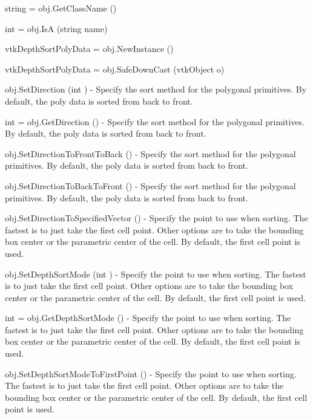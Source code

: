 \begin{DoxyItemize}
\item {\ttfamily string = obj.\-Get\-Class\-Name ()}  
\item {\ttfamily int = obj.\-Is\-A (string name)}  
\item {\ttfamily vtk\-Depth\-Sort\-Poly\-Data = obj.\-New\-Instance ()}  
\item {\ttfamily vtk\-Depth\-Sort\-Poly\-Data = obj.\-Safe\-Down\-Cast (vtk\-Object o)}  
\item {\ttfamily obj.\-Set\-Direction (int )} -\/ Specify the sort method for the polygonal primitives. By default, the poly data is sorted from back to front.  
\item {\ttfamily int = obj.\-Get\-Direction ()} -\/ Specify the sort method for the polygonal primitives. By default, the poly data is sorted from back to front.  
\item {\ttfamily obj.\-Set\-Direction\-To\-Front\-To\-Back ()} -\/ Specify the sort method for the polygonal primitives. By default, the poly data is sorted from back to front.  
\item {\ttfamily obj.\-Set\-Direction\-To\-Back\-To\-Front ()} -\/ Specify the sort method for the polygonal primitives. By default, the poly data is sorted from back to front.  
\item {\ttfamily obj.\-Set\-Direction\-To\-Specified\-Vector ()} -\/ Specify the point to use when sorting. The fastest is to just take the first cell point. Other options are to take the bounding box center or the parametric center of the cell. By default, the first cell point is used.  
\item {\ttfamily obj.\-Set\-Depth\-Sort\-Mode (int )} -\/ Specify the point to use when sorting. The fastest is to just take the first cell point. Other options are to take the bounding box center or the parametric center of the cell. By default, the first cell point is used.  
\item {\ttfamily int = obj.\-Get\-Depth\-Sort\-Mode ()} -\/ Specify the point to use when sorting. The fastest is to just take the first cell point. Other options are to take the bounding box center or the parametric center of the cell. By default, the first cell point is used.  
\item {\ttfamily obj.\-Set\-Depth\-Sort\-Mode\-To\-First\-Point ()} -\/ Specify the point to use when sorting. The fastest is to just take the first cell point. Other options are to take the bounding box center or the parametric center of the cell. By default, the first cell point is used.  

\end{DoxyItemize}
